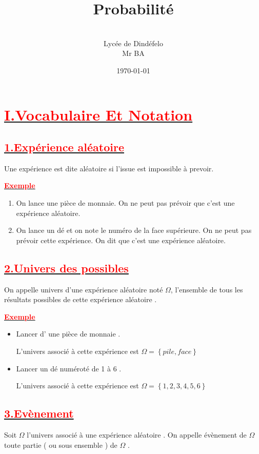 \documentclass[12pt]{article}
\author{\\Lycée de Dindéfelo\\Mr BA}
\title{\textbf{Probabilité}}
\date{\today}
\begin{document}
\maketitle
\newpage
\section*{\underline{\textbf{\textcolor{red}{I.Vocabulaire Et Notation}}}}
\subsection*{\underline{\textbf{\textcolor{red}{1.Expérience aléatoire}}}}
Une expérience est dite aléatoire si l'issue est impossible à prevoir.

\underline{\textbf{\textcolor{red}{Exemple}}}\\

\begin{enumerate}
\item On lance une pièce de monnaie. On ne peut pas prévoir
que c’est une expérience aléatoire.
\item On lance un dé et on note le numéro de la face supérieure. On ne peut pas prévoir
cette expérience. On dit que c’est une expérience aléatoire.
\end{enumerate}
\subsection*{\underline{\textbf{\textcolor{red}{2.Univers des possibles}}}}
On appelle univers d’une expérience aléatoire noté $\Omega$, l’ensemble de tous les résultats possibles de cette expérience aléatoire .

\underline{\textbf{\textcolor{red}{Exemple}}}

\begin{itemize}
\item Lancer d’ une pièce de monnaie .

L’univers associé à cette expérience est $\Omega=\left\lbrace pile, face\right\rbrace$

\item Lancer un dé numéroté de 1 à 6 . 

L’univers associé à cette expérience est $\Omega=\left\lbrace 1, 2, 3, 4, 5, 6\right\rbrace$
\end{itemize}

\subsection*{\underline{\textbf{\textcolor{red}{3.Evènement}}}}
Soit $\Omega$ l’univers associé à une expérience aléatoire . On appelle évènement de $\Omega$ toute partie ( ou sous ensemble ) de $\Omega$ .
\end{document}
